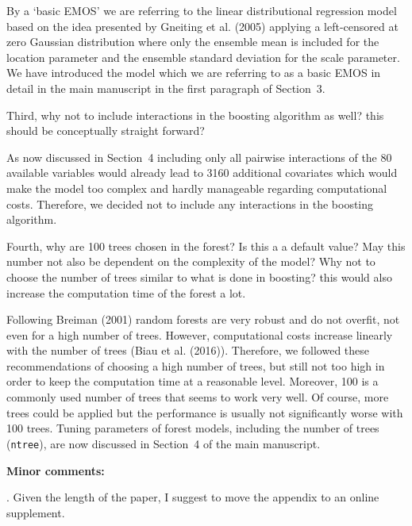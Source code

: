 \documentclass[american,foldmarks=false,noconfig]{uibklttr}
\newenvironment{review}{\fontshape{\itdefault}\fontseries{\bfdefault} \selectfont \smallskip}{\par}
\begin{document}
By a `basic EMOS' we are referring to the linear distributional 
regression model based on the idea presented by Gneiting et al. (2005) 
applying a left-censored at zero Gaussian distribution where only the 
ensemble mean is included for the location parameter and the ensemble 
standard deviation for the scale parameter.
We have introduced the model which we are referring to as a basic EMOS 
in detail in the main manuscript in the first paragraph of Section~3. 


\begin{review}
Third, why not to include interactions in the boosting algorithm 
as well? this should be conceptually straight forward? 
\end{review}

As now discussed in Section~4 including only all pairwise interactions
of the 80 available variables would already lead to 3160 additional
covariates which would make the model too complex and hardly manageable
regarding computational costs. Therefore, we decided not to include
any interactions in the boosting algorithm.

\begin{review}
Fourth, why are 100 trees chosen in the forest? Is this a a default 
value? May this number not also be dependent on the complexity of 
the model? Why not to choose the number of trees similar to what is 
done in boosting? this would also increase the computation time of 
the forest a lot.
\end{review}


Following Breiman (2001) random forests are very robust and do not overfit, 
not even for a high number of trees. However, computational costs increase 
linearly with the number of trees (Biau et al. (2016)).
Therefore, we followed these recommendations of choosing a high number of
trees, but still not too high in order to keep the computation time at
a reasonable level. Moreover, 100 is a commonly used number of trees that
seems to work very well. Of course, more trees could be applied but 
the performance is usually not significantly worse with 100 trees.
Tuning parameters of forest models, including the number of 
trees (\texttt{ntree}), are now discussed in Section~4 
of the main manuscript.





\bigskip

\textbf{Minor comments:}


\begin{review}
1. Given the length of the paper, I suggest to move the 
appendix to an online supplement.
\end{review}
\end{document}
